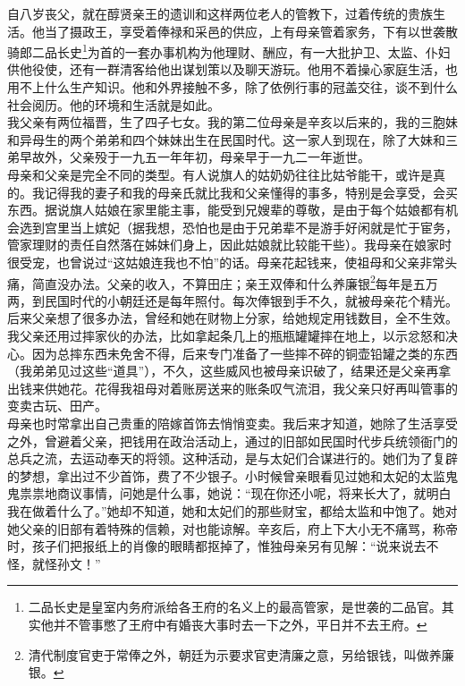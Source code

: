 自八岁丧父，就在醇贤亲王的遗训和这样两位老人的管教下，过着传统的贵族生活。他当了摄政王，享受着俸禄和采邑的供应，上有母亲管着家务，下有以世袭散骑郎二品长史\footnote{二品长史是皇室内务府派给各王府的名义上的最高管家，是世袭的二品官。其实他并不管事憋了王府中有婚丧大事时去一下之外，平日并不去王府。}为首的一套办事机构为他理财、酬应，有一大批护卫、太监、仆妇供他役使，还有一群清客给他出谋划策以及聊天游玩。他用不着操心家庭生活，也用不上什么生产知识。他和外界接触不多，除了依例行事的冠盖交往，谈不到什么社会阅历。他的环境和生活就是如此。\\

我父亲有两位福晋，生了四子七女。我的第二位母亲是辛亥以后来的，我的三胞妹和异母生的两个弟弟和四个妹妹出生在民国时代。这一家人到现在，除了大妹和三弟早故外，父亲殁于一九五一年年初，母亲早于一九二一年逝世。\\

母亲和父亲是完全不同的类型。有人说旗人的姑奶奶往往比姑爷能干，或许是真的。我记得我的妻子和我的母亲氏就比我和父亲懂得的事多，特别是会享受，会买东西。据说旗人姑娘在家里能主事，能受到兄嫂辈的尊敬，是由于每个姑娘都有机会选到宫里当上嫔妃（据我想，恐怕也是由于兄弟辈不是游手好闲就是忙于宦务，管家理财的责任自然落在姊妹们身上，因此姑娘就比较能干些）。我母亲在娘家时很受宠，也曾说过“这姑娘连我也不怕”的话。母亲花起钱来，使祖母和父亲非常头痛，简直没办法。父亲的收入，不算田庄；亲王双俸和什么养廉银\footnote{清代制度官吏于常俸之外，朝廷为示要求官吏清廉之意，另给银钱，叫做养廉银。}每年是五万两，到民国时代的小朝廷还是每年照付。每次俸银到手不久，就被母亲花个精光。后来父亲想了很多办法，曾经和她在财物上分家，给她规定用钱数目，全不生效。我父亲还用过摔家伙的办法，比如拿起条几上的瓶瓶罐罐摔在地上，以示忿怒和决心。因为总摔东西未免舍不得，后来专门准备了一些摔不碎的铜壶铅罐之类的东西（我弟弟见过这些“道具”），不久，这些威风也被母亲识破了，结果还是父亲再拿出钱来供她花。花得我祖母对着账房送来的账条叹气流泪，我父亲只好再叫管事的变卖古玩、田产。\\

母亲也时常拿出自己贵重的陪嫁首饰去悄悄变卖。我后来才知道，她除了生活享受之外，曾避着父亲，把钱用在政治活动上，通过的旧部如民国时代步兵统领衙门的总兵之流，去运动奉天的将领。这种活动，是与太妃们合谋进行的。她们为了复辟的梦想，拿出过不少首饰，费了不少银子。小时候曾亲眼看见过她和太妃的太监鬼鬼祟祟地商议事情，问她是什么事，她说：“现在你还小呢，将来长大了，就明白我在做着什么了。”她却不知道，她和太妃们的那些财宝，都给太监和中饱了。她对她父亲的旧部有着特殊的信赖，对也能谅解。辛亥后，府上下大小无不痛骂，称帝时，孩子们把报纸上的肖像的眼睛都抠掉了，惟独母亲另有见解：“说来说去不怪，就怪孙文！”\\

